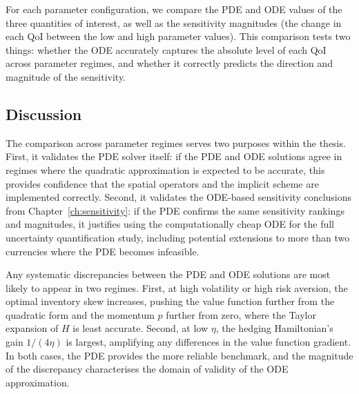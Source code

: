 For each parameter configuration, we compare the PDE and ODE values of the three quantities of interest, as well as the sensitivity magnitudes (the change in each QoI between the low and high parameter values). This comparison tests two things: whether the ODE accurately captures the absolute level of each QoI across parameter regimes, and whether it correctly predicts the direction and magnitude of the sensitivity.



\subsection{Discussion}
\label{sec:pde-discussion}

The comparison across parameter regimes serves two purposes within the thesis. First, it validates the PDE solver itself: if the PDE and ODE solutions agree in regimes where the quadratic approximation is expected to be accurate, this provides confidence that the spatial operators and the implicit scheme are implemented correctly. Second, it validates the ODE-based sensitivity conclusions from Chapter~\ref{ch:sensitivity}: if the PDE confirms the same sensitivity rankings and magnitudes, it justifies using the computationally cheap ODE for the full uncertainty quantification study, including potential extensions to more than two currencies where the PDE becomes infeasible.

Any systematic discrepancies between the PDE and ODE solutions are most likely to appear in two regimes. First, at high volatility or high risk aversion, the optimal inventory skew increases, pushing the value function further from the quadratic form and the momentum $p$ further from zero, where the Taylor expansion of $H$ is least accurate. Second, at low $\eta$, the hedging Hamiltonian's gain $1/(4\eta)$ is largest, amplifying any differences in the value function gradient. In both cases, the PDE provides the more reliable benchmark, and the magnitude of the discrepancy characterises the domain of validity of the ODE approximation.
